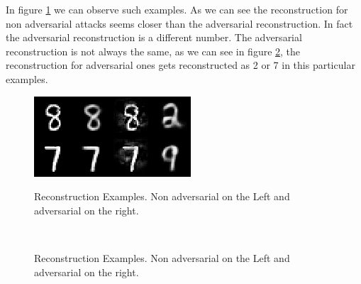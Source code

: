 \documentclass{asaproc}
\begin{document}
In figure \ref{fig8} we can observe such examples. As we can see the reconstruction for non adversarial attacks seems closer than the adversarial reconstruction. In fact the adversarial reconstruction is a different number. The adversarial reconstruction is not always the same, as we can see in figure \ref{fig9}, the reconstruction for adversarial ones gets reconstructed as 2 or 7 in this particular examples.

\begin{figure}[h!]
	\centering
	\caption{\enspace Reconstruction Examples. Non adversarial on the Left and adversarial on the right.}
	\includegraphics[width=\linewidth]{recon-fig5}
	\label{fig8}
\end{figure}

\begin{figure}[h!]
	\centering
	\caption{\enspace Reconstruction Examples. Non adversarial on the Left and adversarial on the right.}
	 \\
	\label{fig9}
\end{figure}
\end{document}
